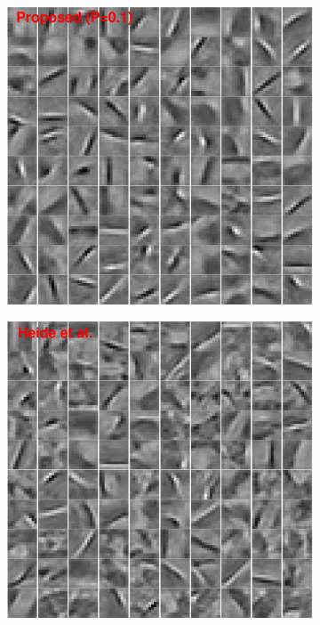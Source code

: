 \begin{figure}[h]
\begin{subfigure}{0.23\textwidth}
  \includegraphics[width=1\linewidth]{figure/batchFruit100.pdf}
\end{subfigure}
\begin{subfigure}{0.23\textwidth}
  \includegraphics[width=1\linewidth]{figure/heideFruit100.pdf}
\end{subfigure}


\end{figure}

